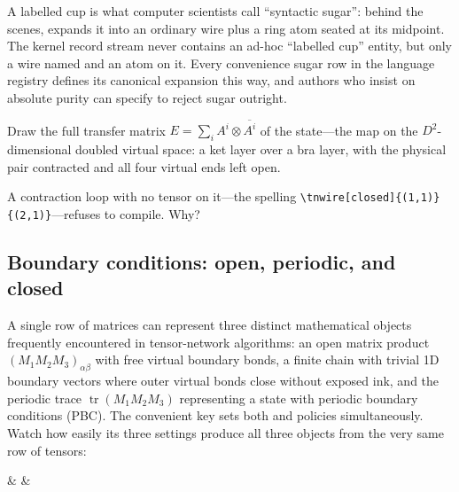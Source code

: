 \dbendpar A labelled cup is what computer scientists call ``syntactic sugar'':
behind the scenes, \pkg{} expands it into an ordinary  wire plus a
ring atom seated at its midpoint.  The kernel record stream never contains an
ad-hoc ``labelled cup'' entity, but only a wire named  and an
atom on it.  Every convenience sugar row in the language registry defines its
canonical expansion this way, and authors who insist on absolute purity can
specify  to reject sugar outright.

 Draw the full transfer matrix
$E=\sum_i A^i\otimes\overline{A^i}$ of the state---the map on the
$D^2$-dimensional doubled virtual space: a ket layer over a bra layer, with
the physical pair contracted and all four virtual ends left open.

 A contraction loop with no tensor on it---the
spelling \verb|\tnwire[closed]{(1,1)}{(2,1)}|---refuses to compile.  Why?

\subsection{Boundary conditions: open, periodic, and closed}

A single row of matrices can represent three distinct mathematical objects
frequently encountered in tensor-network algorithms: an open matrix product
$(M_1M_2M_3)_{\alpha\beta}$ with free virtual boundary bonds, a finite chain
with trivial 1D boundary vectors where outer virtual bonds close without exposed
ink, and the periodic trace $\operatorname{tr}(M_1M_2M_3)$ representing a
state with periodic boundary conditions (PBC).  The convenient 
key sets both  and  policies simultaneously.  Watch
how easily its three settings produce all three objects from the very same row
of tensors:

\begin{tnmultiples}[
  formula={(M_1M_2M_3)_{\alpha\beta}},
  caption={one row, three boundary conditions},
  index={Left to right: the outer bonds close trivially and nothing is
    exposed; both ends open and the row is a matrix; the trace returns the
    row to itself and the picture is a scalar.  The quoted signature is the
    open panel's; the other two are empty.},
  signature={kernel-boundary|signature=open:e, open:w},
  variants={{boundary=none}{boundary=none},
            {boundary=open}{boundary=open},
            {boundary=periodic}{boundary=periodic}}]
\begin{tenkz}[rows={wire}, cols=3, variant]
   &  & 
\end{tenkz}
\end{tnmultiples}

